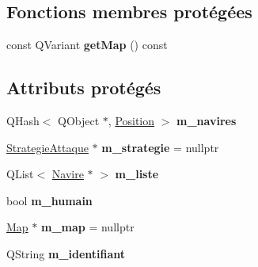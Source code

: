 \subsection*{Fonctions membres protégées}
\begin{DoxyCompactItemize}
\item 
const Q\+Variant {\bfseries get\+Map} () const \hypertarget{class_joueur_a835c64ce76ce21f8baa7bbf9bdb32612}{}\label{class_joueur_a835c64ce76ce21f8baa7bbf9bdb32612}

\end{DoxyCompactItemize}
\subsection*{Attributs protégés}
\begin{DoxyCompactItemize}
\item 
Q\+Hash$<$ Q\+Object $\ast$, \hyperlink{struct_joueur_1_1_position}{Position} $>$ {\bfseries m\+\_\+navires}\hypertarget{class_joueur_aba03135ccdc3901ba8199c2f07b42126}{}\label{class_joueur_aba03135ccdc3901ba8199c2f07b42126}

\item 
\hyperlink{class_strategie_attaque}{Strategie\+Attaque} $\ast$ {\bfseries m\+\_\+strategie} = nullptr\hypertarget{class_joueur_ab5e526d57bc6cd5809f7443b72d4b45c}{}\label{class_joueur_ab5e526d57bc6cd5809f7443b72d4b45c}

\item 
Q\+List$<$ \hyperlink{class_navire}{Navire} $\ast$ $>$ {\bfseries m\+\_\+liste}\hypertarget{class_joueur_a5959e2f19a5a8eba223dde5cebcd3024}{}\label{class_joueur_a5959e2f19a5a8eba223dde5cebcd3024}

\item 
bool {\bfseries m\+\_\+humain}\hypertarget{class_joueur_a557ffbf046f630836151477dd729f829}{}\label{class_joueur_a557ffbf046f630836151477dd729f829}

\item 
\hyperlink{class_map}{Map} $\ast$ {\bfseries m\+\_\+map} = nullptr\hypertarget{class_joueur_af8523f4d4f659e4e1b66a2e4e7a54930}{}\label{class_joueur_af8523f4d4f659e4e1b66a2e4e7a54930}

\item 
Q\+String {\bfseries m\+\_\+identifiant}\hypertarget{class_joueur_a84c7d5ca2764bb11b7034069d07ff951}{}\label{class_joueur_a84c7d5ca2764bb11b7034069d07ff951}

\end{DoxyCompactItemize}
